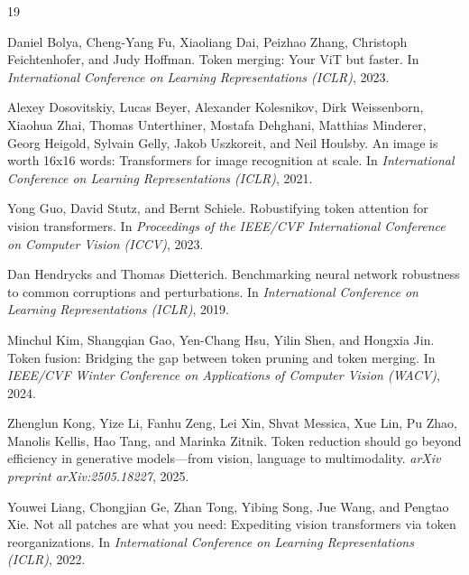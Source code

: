 \documentclass{article}
\begin{document}
\begin{thebibliography}{19}

Daniel Bolya, Cheng-Yang Fu, Xiaoliang Dai, Peizhao Zhang, Christoph Feichtenhofer, and Judy Hoffman.
\newblock Token merging: Your {ViT} but faster.
\newblock In \emph{International Conference on Learning Representations (ICLR)}, 2023.

Alexey Dosovitskiy, Lucas Beyer, Alexander Kolesnikov, Dirk Weissenborn, Xiaohua Zhai, Thomas Unterthiner, Mostafa Dehghani, Matthias Minderer, Georg Heigold, Sylvain Gelly, Jakob Uszkoreit, and Neil Houlsby.
\newblock An image is worth 16x16 words: Transformers for image recognition at scale.
\newblock In \emph{International Conference on Learning Representations (ICLR)}, 2021.

Yong Guo, David Stutz, and Bernt Schiele.
\newblock Robustifying token attention for vision transformers.
\newblock In \emph{Proceedings of the IEEE/CVF International Conference on Computer Vision (ICCV)}, 2023.

Dan Hendrycks and Thomas Dietterich.
\newblock Benchmarking neural network robustness to common corruptions and perturbations.
\newblock In \emph{International Conference on Learning Representations (ICLR)}, 2019.

Minchul Kim, Shangqian Gao, Yen-Chang Hsu, Yilin Shen, and Hongxia Jin.
\newblock Token fusion: Bridging the gap between token pruning and token merging.
\newblock In \emph{IEEE/CVF Winter Conference on Applications of Computer Vision (WACV)}, 2024.

Zhenglun Kong, Yize Li, Fanhu Zeng, Lei Xin, Shvat Messica, Xue Lin, Pu Zhao, Manolis Kellis, Hao Tang, and Marinka Zitnik.
\newblock Token reduction should go beyond efficiency in generative models---from vision, language to multimodality.
\newblock \emph{arXiv preprint arXiv:2505.18227}, 2025.

Youwei Liang, Chongjian Ge, Zhan Tong, Yibing Song, Jue Wang, and Pengtao Xie.
\newblock Not all patches are what you need: Expediting vision transformers via token reorganizations.
\newblock In \emph{International Conference on Learning Representations (ICLR)}, 2022.


\end{thebibliography}
\end{document}
